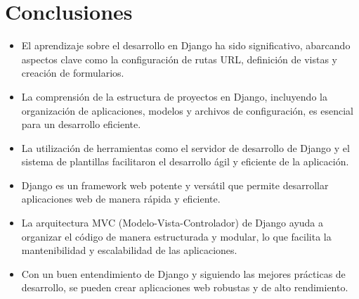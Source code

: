 \documentclass{article}
\begin{document}
  \section{Conclusiones}
  \begin{itemize}
    \item El aprendizaje sobre el desarrollo en Django ha sido significativo, abarcando aspectos clave como 
    la configuración de rutas URL, definición de vistas y creación de formularios.
    \item La comprensión de la estructura de proyectos en Django, incluyendo la organización de aplicaciones, modelos y 
    archivos de configuración, es esencial para un desarrollo eficiente.
    \item La utilización de herramientas como el servidor de desarrollo de Django y el sistema de plantillas facilitaron 
    el desarrollo ágil y eficiente de la aplicación.
    \item Django es un framework web potente y versátil que permite desarrollar aplicaciones web de manera rápida y eficiente.
    \item La arquitectura MVC (Modelo-Vista-Controlador) de Django ayuda a organizar el código de manera estructurada y modular, 
    lo que facilita la mantenibilidad y escalabilidad de las aplicaciones.
    \item Con un buen entendimiento de Django y siguiendo las mejores prácticas de desarrollo, se pueden crear aplicaciones web 
    robustas y de alto rendimiento.
  \end{itemize}
  
	\newpage
\end{document}
